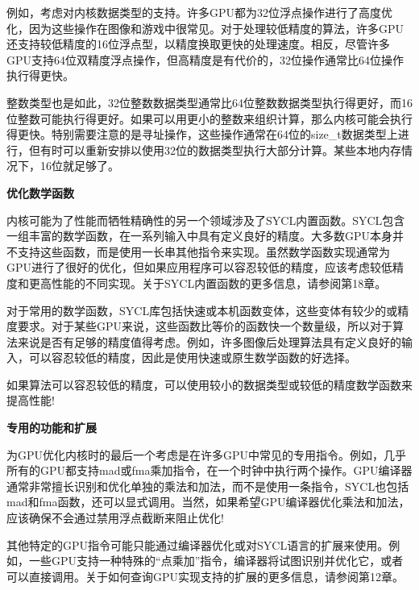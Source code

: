 例如，考虑对内核数据类型的支持。许多GPU都为32位浮点操作进行了高度优化，因为这些操作在图像和游戏中很常见。对于处理较低精度的算法，许多GPU还支持较低精度的16位浮点型，以精度换取更快的处理速度。相反，尽管许多GPU支持64位双精度浮点操作，但高精度是有代价的，32位操作通常比64位操作执行得更快。\par

整数类型也是如此，32位整数数据类型通常比64位整数数据类型执行得更好，而16位整数可能执行得更好。如果可以用更小的整数来组织计算，那么内核可能会执行得更快。特别需要注意的是寻址操作，这些操作通常在64位的size\_t数据类型上进行，但有时可以重新安排以使用32位的数据类型执行大部分计算。某些本地内存情况下，16位就足够了。\par

\hspace*{\fill} \par %
\textbf{优化数学函数}

内核可能为了性能而牺牲精确性的另一个领域涉及了SYCL内置函数。SYCL包含一组丰富的数学函数，在一系列输入中具有定义良好的精度。大多数GPU本身并不支持这些函数，而是使用一长串其他指令来实现。虽然数学函数实现通常为GPU进行了很好的优化，但如果应用程序可以容忍较低的精度，应该考虑较低精度和更高性能的不同实现。关于SYCL内置函数的更多信息，请参阅第18章。\par

对于常用的数学函数，SYCL库包括快速或本机函数变体，这些变体有较少的或精度要求。对于某些GPU来说，这些函数比等价的函数快一个数量级，所以对于算法来说是否有足够的精度值得考虑。例如，许多图像后处理算法具有定义良好的输入，可以容忍较低的精度，因此是使用快速或原生数学函数的好选择。\par

\begin{tcolorbox}[colback=red!5!white,colframe=red!75!black]
如果算法可以容忍较低的精度，可以使用较小的数据类型或较低的精度数学函数来提高性能!
\end{tcolorbox}

\hspace*{\fill} \par %
\textbf{专用的功能和扩展}

为GPU优化内核时的最后一个考虑是在许多GPU中常见的专用指令。例如，几乎所有的GPU都支持mad或fma乘加指令，在一个时钟中执行两个操作。GPU编译器通常非常擅长识别和优化单独的乘法和加法，而不是使用一条指令，SYCL也包括mad和fma函数，还可以显式调用。当然，如果希望GPU编译器优化乘法和加法，应该确保不会通过禁用浮点截断来阻止优化!\par

其他特定的GPU指令可能只能通过编译器优化或对SYCL语言的扩展来使用。例如，一些GPU支持一种特殊的“点乘加”指令，编译器将试图识别并优化它，或者可以直接调用。关于如何查询GPU实现支持的扩展的更多信息，请参阅第12章。\par







